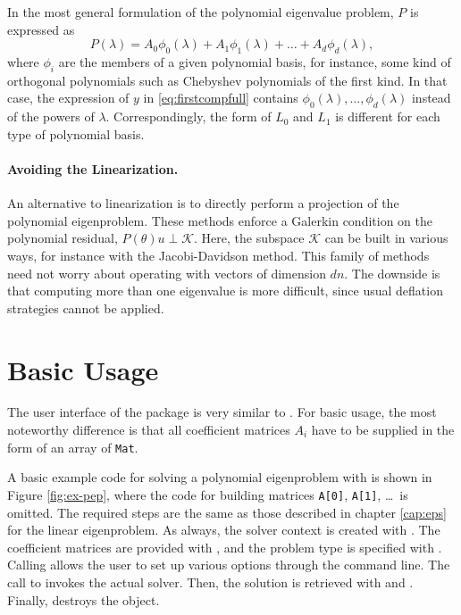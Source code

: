 In the most general formulation of the polynomial eigenvalue problem, $P$ is expressed as
\begin{equation}
\label{eq:pepnonmon}
P(\lambda)=A_0\phi_0(\lambda)+A_1\phi_1(\lambda)+\dots+A_d\phi_d(\lambda),
\end{equation}
where $\phi_i$ are the members of a given polynomial basis, for instance, some kind of orthogonal polynomials such as Chebyshev polynomials of the first kind. In that case, the expression of $y$ in \eqref{eq:firstcompfull} contains $\phi_0(\lambda),\dots,\phi_d(\lambda)$ instead of the powers of $\lambda$. Correspondingly, the form of $L_0$ and $L_1$ is different for each type of polynomial basis.

\paragraph{Avoiding the Linearization.}

An alternative to linearization is to directly perform a projection of the polynomial eigenproblem. These methods enforce a Galerkin condition on the polynomial residual, $P(\theta)u\perp \mathcal{K}$. Here, the subspace $\mathcal{K}$ can be built in various ways, for instance with the Jacobi-Davidson method. This family of methods need not worry about operating with vectors of dimension $dn$. The downside is that computing more than one eigenvalue is more difficult, since usual deflation strategies cannot be applied.

\section{Basic Usage}

The user interface of the  package is very similar to . For basic usage, the most noteworthy difference is that all coefficient matrices $A_i$ have to be supplied in the form of an array of \texttt{Mat}.

A basic example code for solving a polynomial eigenproblem with  is shown in Figure \ref{fig:ex-pep}, where the code for building matrices \texttt{A[0]}, \texttt{A[1]}, \ldots\ is omitted. The required steps are the same as those described in chapter \ref{cap:eps} for the linear eigenproblem. As always, the solver context is created with . The coefficient matrices are provided with , and the problem type is specified with . Calling  allows the user to set up various options through the command line. The call to  invokes the actual solver. Then, the solution is retrieved with  and . Finally,  destroys the object.


